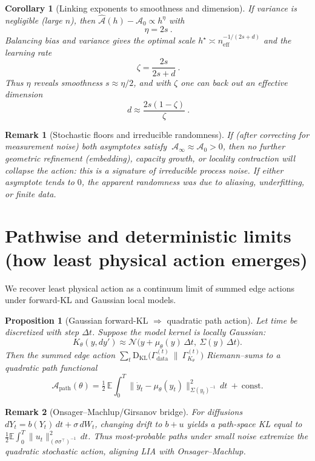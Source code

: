 \documentclass[11pt]{article}
\newtheorem{proposition}{Proposition}
\newtheorem{remark}{Remark}
\newtheorem{corollary}{Corollary}
\newcommand{\E}{\mathbb{E}}
\newcommand{\KL}{\mathrm{D}_{\mathrm{KL}}}
\newcommand{\1}{\mathbf{1}}
\begin{document}
\begin{corollary}[Linking exponents to smoothness and dimension]
If variance is negligible (large \(n\)), then \(\widehat{\mathcal A}(h)-\mathcal A_0\propto h^{\eta}\) with
\[
\boxed{\ \eta=2s\ }.
\]
Balancing bias and variance gives the optimal scale \(h^\star\asymp n_{\mathrm{eff}}^{-1/(2s+d)}\) and the learning rate
\[
\boxed{\ \zeta=\frac{2s}{2s+d}\ }.
\]
Thus \(\eta\) reveals smoothness \(s\approx \eta/2\), and with \(\zeta\) one can back out an \emph{effective} dimension
\[
\boxed{\ d \approx \frac{2s(1-\zeta)}{\zeta}\ }.
\]
\end{corollary}

\begin{remark}[Stochastic floors and irreducible randomness]
If (after correcting for measurement noise) both asymptotes satisfy
\(\ \mathcal A_\infty \approx \mathcal A_0 > 0\), then no further geometric refinement (embedding), capacity growth, or locality contraction will collapse the action: this is a \emph{signature of irreducible process noise}. If either asymptote tends to \(0\), the apparent randomness was due to aliasing, underfitting, or finite data.
\end{remark}

\section{Pathwise and deterministic limits (how least physical action emerges)}
We recover least physical action as a continuum limit of summed edge actions under forward-KL and Gaussian local models.
\begin{proposition}[Gaussian forward-KL $\Rightarrow$ quadratic path action]
Let time be discretized with step \(\Delta t\). Suppose the model kernel is locally Gaussian:
\[
K_\theta(y,dy') \approx \mathcal N\!\big(y+\mu_\theta(y)\,\Delta t,\ \Sigma(y)\,\Delta t\big).
\]
Then the summed edge action \(\sum_t \KL\big(\Gamma_{\text{data}}^{(t)}\ \|\ \Gamma_{K_\theta}^{(t)}\big)\)
Riemann--sums to a quadratic path functional
\[
\mathcal A_{\mathrm{path}}(\theta)
= \tfrac12\,\E\!\int_0^T \big\|\dot y_t-\mu_\theta(y_t)\big\|^2_{\Sigma(y_t)^{-1}}\,dt\ +\ \text{const}.
\]
\end{proposition}

\begin{remark}[Onsager--Machlup/Girsanov bridge]
For diffusions \(dY_t=b(Y_t)\,dt+\sigma\,dW_t\), changing drift to \(b+u\) yields a path-space KL equal to
\(\tfrac12\E\!\int_0^T \|u_t\|^2_{(\sigma\sigma^\top)^{-1}}\,dt\). Thus most-probable paths under small noise extremize the quadratic stochastic action, aligning LIA with Onsager--Machlup.
\end{remark}
\end{document}
